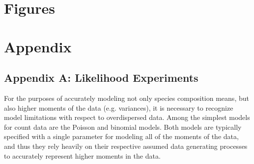 \documentclass[12pt]{article}
\begin{document}
\section{Figures}
%
%

%
%
\section{Appendix}\label{appendix}
%
%

%
\subsection{Appendix A: Likelihood Experiments}\label{likelihoodAppendix}

%
%
%



%
For the purposes of accurately modeling not only species composition means, 
but also higher moments of the data (e.g. variances), it is necessary to 
recognize model limitations with respect to overdispersed data. Among the 
simplest models for count data are the Poisson and binomial models. Both 
models are typically specified with a single parameter for modeling all of the 
moments of the data, and thus they rely heavily on their respective assumed 
data generating processes to accurately represent higher moments in the data. 
\end{document}
